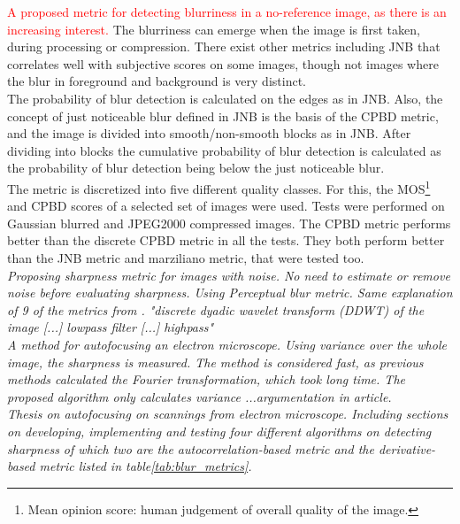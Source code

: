 \textcolor{red}{A proposed metric for detecting blurriness in a no-reference image, as there is an increasing interest.} The blurriness can emerge when the image is first taken, during processing or compression. There exist other metrics including JNB\cite{JNB} that correlates well with subjective scores on some images, though not images where the blur in foreground and background is very distinct.\\
The probability of blur detection is calculated on the edges as in JNB\cite{JNB}. Also, the concept of just noticeable blur defined in JNB is the basis of the CPBD metric, and the image is divided into smooth/non-smooth blocks as in JNB. After dividing into blocks the cumulative probability of blur detection is calculated as the probability of blur detection being below the just noticeable blur.\\
The metric is discretized into five different quality classes. For this, the MOS\footnote{Mean opinion score: human judgement of overall quality of the image.} and CPBD scores of a selected set of images were used. Tests were performed on Gaussian blurred and JPEG2000 compressed images. The CPBD metric performs better than the discrete CPBD metric in all the tests. They both perform better than the JNB metric and marziliano metric, that were tested too.\\


\textit{Proposing sharpness metric for images with noise. No need to estimate or remove noise before evaluating sharpness. Using Perceptual blur metric\cite{jnbm03}. Same explanation of 9 of the metrics from \cite{JNB}. "discrete dyadic wavelet transform (DDWT) of the image [...] lowpass filter [...] highpass"}\\

\textit{A method for autofocusing an electron microscope. Using variance over the whole image, the sharpness is measured. The method is considered fast, as previous methods calculated the Fourier transformation, which took long time. The proposed algorithm only calculates variance ...argumentation in article.}\cite{jnbm05}\\

\textit{Thesis on autofocusing on scannings from electron microscope.\cite{jnbm06} Including sections on developing, implementing and testing four different algorithms on detecting sharpness of which two are the autocorrelation-based metric and the derivative-based metric listed in table\ref{tab:blur_metrics}.}\\

